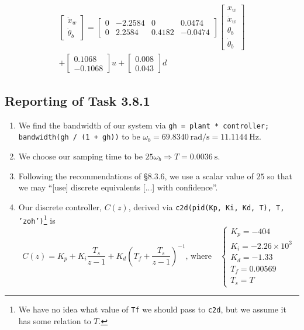 \documentclass[11pt]{article} %
\begin{document}
\begin{enumerate}
\begin{equation*}
\begin{aligned}
\begin{bmatrix}
        \ddot{x}_w \\
        \ddot{\theta}_b
      \end{bmatrix}
      =
      \begin{bmatrix}
        0 & -2.2584 & 0 & 0.0474 \\
        0 & 2.2584 & 0.4182 & -0.0474
      \end{bmatrix}
      \begin{bmatrix}
        x_w\\
        \dot{x}_w\\
        \theta_b\\
        \dot{\theta}_b
      \end{bmatrix}
      \\
      +
      \begin{bmatrix}
        0.1068 \\
        -0.1068
      \end{bmatrix}
      u
      +
      \begin{bmatrix}
        0.008 \\
        0.043
      \end{bmatrix}
      d
    \end{aligned}
  \end{equation*}
\end{enumerate}
\subsection*{Reporting of Task 3.8.1}
\begin{enumerate}
\item We find the bandwidth of our system via \texttt{gh = plant *
    controller; bandwidth(gh / (1 + gh))} to be
  $\omega_b = 69.8340~\text{rad/s} = 11.1144~\text{Hz}$.
\item We choose our samping time to be
  $25\omega_b \Rightarrow T = 0.0036~\text{s}$.
\item Following the recommendations of §8.3.6, we use a scalar value
  of $25$ so that we may ``[use] discrete equivalents [...] with
  confidence''.
\item
  Our discrete controller, $C(z)$, derived via \texttt{c2d(pid(Kp, Ki,
    Kd, T), T, ’zoh’)}\footnote{We have no idea what value of
    \texttt{Tf} we should pass to \texttt{c2d}, but we assume it has
    some relation to $T$.} is
  \begin{equation}
    C(z) =
    K_p
    + K_i\frac{T_s}{z - 1}
    + K_d\left(
      T_f + \frac{T_s}{z - 1}
    \right)^{-1}
    \text{, where}
    \quad
    \begin{cases}
      K_p = -404 \\
      K_i = -2.26 \times 10^{3} \\
      K_d = -1.33 \\
      T_f = 0.00569 \\
      T_s = T
    \end{cases}
  \end{equation}
\end{enumerate}
\end{document}
